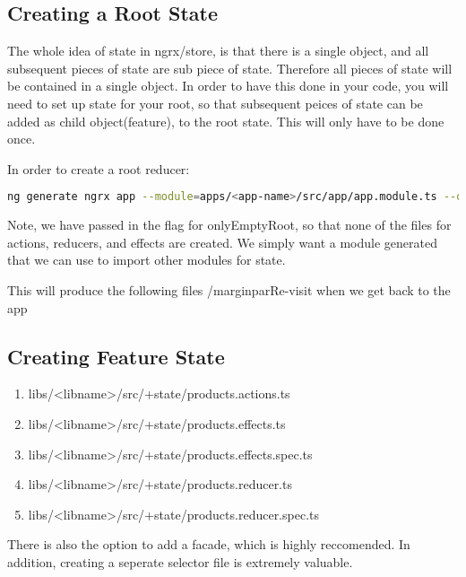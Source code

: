\subsection{Creating a Root State}

The whole idea of state in ngrx/store, is that there is a single object, and
all subsequent pieces of state are sub piece of state. Therefore all pieces of
state will be contained in a single object. In order to have this done in your
code, you will need to set up state for your root, so that subsequent peices of
state can be added as child object(feature), to the root state. This will only
have to be done once.

In order to create a root reducer:
\begin{lstlisting}[language=Bash]
  ng generate ngrx app --module=apps/<app-name>/src/app/app.module.ts --onlyEmptyRoot
\end{lstlisting}

Note, we have passed in the flag for onlyEmptyRoot, so that none of the files
for actions, reducers, and effects are created. We simply want a module
generated that we can use to import other modules for state.

This will produce the following files /marginpar{Re-visit when we get back to
the app}

\subsection{Creating Feature State}


\begin{enumerate}
  \item libs/<libname>/src/+state/products.actions.ts
  \item libs/<libname>/src/+state/products.effects.ts
  \item libs/<libname>/src/+state/products.effects.spec.ts
  \item libs/<libname>/src/+state/products.reducer.ts
  \item libs/<libname>/src/+state/products.reducer.spec.ts
\end{enumerate}

There is also the option to add a facade, which is highly reccomended. In
addition, creating a seperate selector file is extremely valuable.
